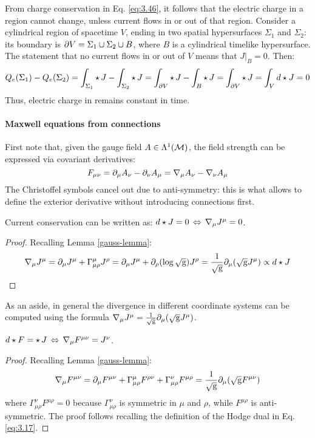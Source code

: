 From charge conservation in Eq. \ref{eq:3.46}, it follows that the electric charge in a region cannot change, unless current flows in or out of that region. Consider a cylindrical region of spacetime $ V $, ending in two spatial hypersurfaces $ \Sigma_1 $ and $ \Sigma_2 $: its boundary is $ \partial V = \Sigma_1 \cup \Sigma_2 \cup B $, where $ B $ is a cylindrical timelike hypersurface. The statement that no current flows in or out of $ V $ means that $ J \vert_B = 0 $. Then:
\begin{equation*}
  Q_e(\Sigma_1) - Q_e(\Sigma_2) = \int_{\Sigma_1} \star\, J - \int_{\Sigma_2} \star\, J = \int_{\partial V} \star\, J - \int_B \star\, J = \int_{\partial V} \star\, J = \int_V d\star J = 0
\end{equation*}
Thus, electric charge in remains constant in time.

\paragraph{Maxwell equations from connections} First note that, given the gauge field $ A \in \Lambda^{1}(\mathcal{M}) $, the field strength can be expressed via covariant derivatives:
\begin{equation*}
  F_{\mu \nu} = \partial_\mu A_\nu - \partial_\nu A_\mu = \nabla_\mu A_\nu - \nabla_\nu A_\mu
\end{equation*}
The Christoffel symbols cancel out due to anti-symmetry: this is what allows to define the exterior derivative without introducing connections first.

\begin{proposition}
  Current conservation can be written as: $ d \star J = 0 \,\Leftrightarrow\, \nabla_\mu J^\mu = 0 $.
\end{proposition}
\begin{proof}
  Recalling Lemma \ref{gauss-lemma}:
  \begin{equation*}
    \nabla_\mu J^\mu = \partial_\mu J^\mu + \Gamma^\mu_{\mu \rho} J^\rho = \partial_\mu J^\mu + \partial_\rho (\log \sqrt{\mathrm{g}}) J^\rho = \frac{1}{\sqrt{\mathrm{g}}} \partial_\mu (\sqrt{\mathrm{g}} J^\mu) \propto d \star J
  \end{equation*}
\end{proof}

As an aside, in general the divergence in different coordinate systems can be computed using the formula $ \nabla_\mu J^\mu = \frac{1}{\sqrt{\mathrm{g}}} \partial_\mu (\sqrt{\mathrm{g}} J^\mu) $.

\begin{proposition}\label{prop-max-eq}
  $ d \star F = \star\, J \,\Leftrightarrow\, \nabla_\mu F^{\mu \nu} = J^\nu $.
\end{proposition}
\begin{proof}
  Recalling Lemma \ref{gauss-lemma}:
  \begin{equation*}
    \nabla_\mu F^{\mu \nu} = \partial_\mu F^{\mu \nu} + \Gamma^\mu_{\mu \rho} F^{\rho \nu} + \Gamma^\nu_{\mu \rho} F^{\mu \rho} = \frac{1}{\sqrt{\mathrm{g}}} \partial_\mu (\sqrt{\mathrm{g}} F^{\mu \nu})
  \end{equation*}
  where $ \Gamma^\nu_{\mu \rho} F^{\mu \rho} = 0 $ because $ \Gamma^\nu_{\mu \rho} $ is symmetric in $ \mu $ and $ \rho $, while $ F^{\mu \rho} $ is anti-symmetric. The proof follows recalling the definition of the Hodge dual in Eq. \ref{eq:3.17}.
\end{proof}

